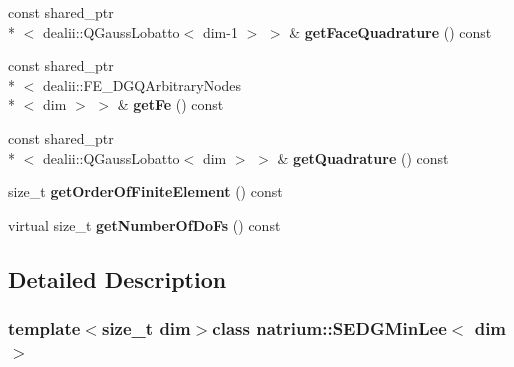\begin{DoxyCompactItemize}
\item 
\hypertarget{classnatrium_1_1SEDGMinLee_a653928dc9f0dd3715389b28196cab7bb}{const shared\-\_\-ptr\\*
$<$ dealii\-::\-Q\-Gauss\-Lobatto$<$ dim-\/1 $>$ $>$ \& {\bfseries get\-Face\-Quadrature} () const }\label{classnatrium_1_1SEDGMinLee_a653928dc9f0dd3715389b28196cab7bb}

\item 
\hypertarget{classnatrium_1_1SEDGMinLee_adb3df3ea790cb6a4d58dd9bed2e1ce1c}{const shared\-\_\-ptr\\*
$<$ dealii\-::\-F\-E\-\_\-\-D\-G\-Q\-Arbitrary\-Nodes\\*
$<$ dim $>$ $>$ \& {\bfseries get\-Fe} () const }\label{classnatrium_1_1SEDGMinLee_adb3df3ea790cb6a4d58dd9bed2e1ce1c}

\item 
\hypertarget{classnatrium_1_1SEDGMinLee_ad3ca0f23194a27d69d82d0f3ba89e345}{const shared\-\_\-ptr\\*
$<$ dealii\-::\-Q\-Gauss\-Lobatto$<$ dim $>$ $>$ \& {\bfseries get\-Quadrature} () const }\label{classnatrium_1_1SEDGMinLee_ad3ca0f23194a27d69d82d0f3ba89e345}

\item 
\hypertarget{classnatrium_1_1SEDGMinLee_a745a65de3ee72a250c0706e6c7fcc361}{size\-\_\-t {\bfseries get\-Order\-Of\-Finite\-Element} () const }\label{classnatrium_1_1SEDGMinLee_a745a65de3ee72a250c0706e6c7fcc361}

\item 
\hypertarget{classnatrium_1_1SEDGMinLee_af667cda1a894340f614da67c0a0ae5da}{virtual size\-\_\-t {\bfseries get\-Number\-Of\-Do\-Fs} () const }\label{classnatrium_1_1SEDGMinLee_af667cda1a894340f614da67c0a0ae5da}

\end{DoxyCompactItemize}


\subsection{Detailed Description}
\subsubsection*{template$<$size\-\_\-t dim$>$class natrium\-::\-S\-E\-D\-G\-Min\-Lee$<$ dim $>$}

